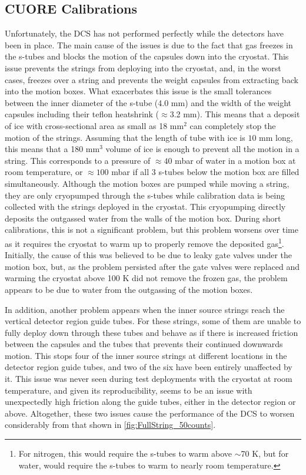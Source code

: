 \subsection*{CUORE Calibrations}
\label{ssec:CUORE Calibrations}
Unfortunately, the DCS has not performed perfectly while the detectors have been in place.
The main cause of the issues is due to the fact that gas freezes in the s-tubes and blocks the motion of the capsules down into the cryostat.
This issue prevents the strings from deploying into the cryostat, and, in the worst cases, freezes over a string and prevents the weight capsules from extracting back into the motion boxes.
What exacerbates this issue is the small tolerances between the inner diameter of the s-tube (4.0 mm) and the width of the weight capsules including their teflon heatshrink ($\approx$3.2 mm).
This means that a deposit of ice with cross-sectional area as small as 18 mm$^2$ can completely stop the motion of the strings.
Assuming that the length of tube with ice is $10$ mm long, this means that a 180 mm$^3$ volume of ice is enough to prevent all the motion in a string.
This corresponds to a pressure of $\approx40$ mbar of water in a motion box at room temperature, or $\approx100$ mbar if all 3 s-tubes below the motion box are filled simultaneously.
Although the motion boxes are pumped while moving a string, they are only cryopumped through the s-tubes while calibration data is being collected with the strings deployed in the cryostat.
This cryopumping directly deposits the outgassed water from the walls of the motion box.
During short calibrations, this is not a significant problem, but this problem worsens over time as it requires the cryostat to warm up to properly remove the deposited gas\footnote{For nitrogen, this would require the s-tubes to warm above $\sim$70 K, but for water, would require the s-tubes to warm to nearly room temperature.}.
Initially, the cause of this was believed to be due to leaky gate valves under the motion box, but, as the problem persisted after the gate valves were replaced and warming the cryostat above 100 K did not remove the frozen gas, the problem appears to be due to water from the outgassing of the motion boxes.

In addition, another problem appears when the inner source strings reach the vertical detector region guide tubes.
For these strings, some of them are unable to fully deploy down through these tubes and behave as if there is increased friction between the capsules and the tubes that prevents their continued downwards motion.
This stops four of the inner source strings at different locations in the detector region guide tubes, and two of the six have been entirely unaffected by it.
This issue was never seen during test deployments with the cryostat at room temperature, and given its reproducibility, seems to be an issue with unexpectedly high friction along the guide tubes, either in the detector region or above.
Altogether, these two issues cause the performance of the DCS to worsen considerably from that shown in \autoref{fig:FullString_50counts}.

